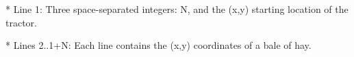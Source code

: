 * Line 1: Three space-separated integers: N, and the (x,y) starting         location of the tractor.

* Lines 2..1+N: Each line contains the (x,y) coordinates of a bale of         hay.